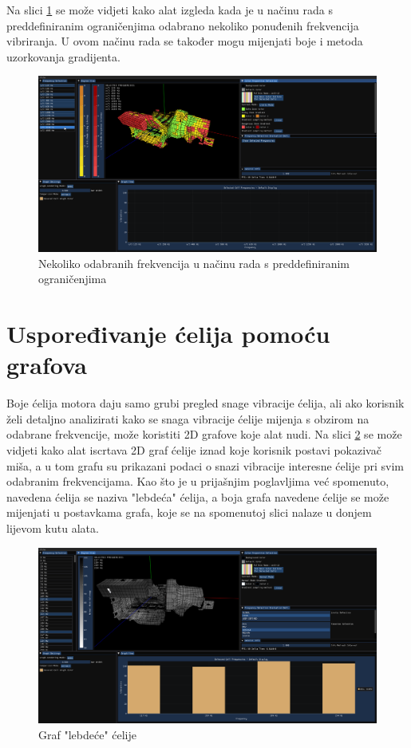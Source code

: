 \documentclass[times, utf8, diplomski]{fer}
\begin{document}
Na slici \ref{fig:limits-mode-frq-selected} se može vidjeti kako alat izgleda kada je u načinu rada s preddefiniranim ograničenjima odabrano nekoliko ponuđenih frekvencija vibriranja. U ovom načinu rada se također mogu mijenjati boje i metoda uzorkovanja gradijenta.

\begin{figure} [H]
	\centering
    \includegraphics[width=\textwidth]{demonstration/limits_mode_frq_selected.png}
    \caption{Nekoliko odabranih frekvencija u načinu rada s preddefiniranim ograničenjima}
    \label{fig:limits-mode-frq-selected}
\end{figure}

\section{Uspoređivanje ćelija pomoću grafova}

Boje ćelija motora daju samo grubi pregled snage vibracije ćelija, ali ako korisnik želi detaljno analizirati kako se snaga vibracije ćelije mijenja s obzirom na odabrane frekvencije, može koristiti 2D grafove koje alat nudi. Na slici \ref{fig:hovered-graph} se može vidjeti kako alat iscrtava 2D graf ćelije iznad koje korisnik postavi pokazivač miša, a u tom grafu su prikazani podaci o snazi vibracije interesne ćelije pri svim odabranim frekvencijama. Kao što je u prijašnjim poglavljima već spomenuto, navedena ćelija se naziva "lebdeća" ćelija, a boja grafa navedene ćelije se može mijenjati u postavkama grafa, koje se na spomenutoj slici nalaze u donjem lijevom kutu alata.

\begin{figure} [H]
	\centering
    \includegraphics[width=\textwidth]{demonstration/cell_hovered.png}
    \caption{Graf "lebdeće" ćelije}
    \label{fig:hovered-graph}
\end{figure}
\end{document}
